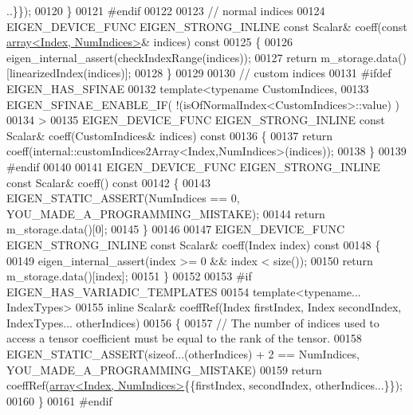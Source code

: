 \begin{DoxyCode}
      ..\}\});
00120     \}
00121 \textcolor{preprocessor}{#endif}
00122 
00123     \textcolor{comment}{// normal indices}
00124     EIGEN\_DEVICE\_FUNC EIGEN\_STRONG\_INLINE \textcolor{keyword}{const} Scalar& coeff(\textcolor{keyword}{const} 
      \hyperlink{class_eigen_1_1array}{array<Index, NumIndices>}& indices)\textcolor{keyword}{ const}
00125 \textcolor{keyword}{    }\{
00126       eigen\_internal\_assert(checkIndexRange(indices));
00127       \textcolor{keywordflow}{return} m\_storage.data()[linearizedIndex(indices)];
00128     \}
00129 
00130     \textcolor{comment}{// custom indices}
00131 \textcolor{preprocessor}{#ifdef EIGEN\_HAS\_SFINAE}
00132     \textcolor{keyword}{template}<\textcolor{keyword}{typename} CustomIndices,
00133              EIGEN\_SFINAE\_ENABLE\_IF( !(isOfNormalIndex<CustomIndices>::value) )
00134     >
00135     EIGEN\_DEVICE\_FUNC EIGEN\_STRONG\_INLINE \textcolor{keyword}{const} Scalar& coeff(CustomIndices& indices)\textcolor{keyword}{ const}
00136 \textcolor{keyword}{    }\{
00137         \textcolor{keywordflow}{return} coeff(internal::customIndices2Array<Index,NumIndices>(indices));
00138     \}
00139 \textcolor{preprocessor}{#endif}
00140 
00141     EIGEN\_DEVICE\_FUNC EIGEN\_STRONG\_INLINE \textcolor{keyword}{const} Scalar& coeff()\textcolor{keyword}{ const}
00142 \textcolor{keyword}{    }\{
00143       EIGEN\_STATIC\_ASSERT(NumIndices == 0, YOU\_MADE\_A\_PROGRAMMING\_MISTAKE);
00144       \textcolor{keywordflow}{return} m\_storage.data()[0];
00145     \}
00146 
00147     EIGEN\_DEVICE\_FUNC EIGEN\_STRONG\_INLINE \textcolor{keyword}{const} Scalar& coeff(Index index)\textcolor{keyword}{ const}
00148 \textcolor{keyword}{    }\{
00149       eigen\_internal\_assert(index >= 0 && index < size());
00150       \textcolor{keywordflow}{return} m\_storage.data()[index];
00151     \}
00152 
00153 \textcolor{preprocessor}{#if EIGEN\_HAS\_VARIADIC\_TEMPLATES}
00154     \textcolor{keyword}{template}<\textcolor{keyword}{typename}... IndexTypes>
00155     \textcolor{keyword}{inline} Scalar& coeffRef(Index firstIndex, Index secondIndex, IndexTypes... otherIndices)
00156     \{
00157       \textcolor{comment}{// The number of indices used to access a tensor coefficient must be equal to the rank of the tensor.}
00158       EIGEN\_STATIC\_ASSERT(\textcolor{keyword}{sizeof}...(otherIndices) + 2 == NumIndices, YOU\_MADE\_A\_PROGRAMMING\_MISTAKE)
00159       \textcolor{keywordflow}{return} coeffRef(\hyperlink{class_eigen_1_1array}{array<Index, NumIndices>}\{\{firstIndex, secondIndex, 
      otherIndices...\}\});
00160     \}
00161 \textcolor{preprocessor}{#endif}

\end{DoxyCode}
